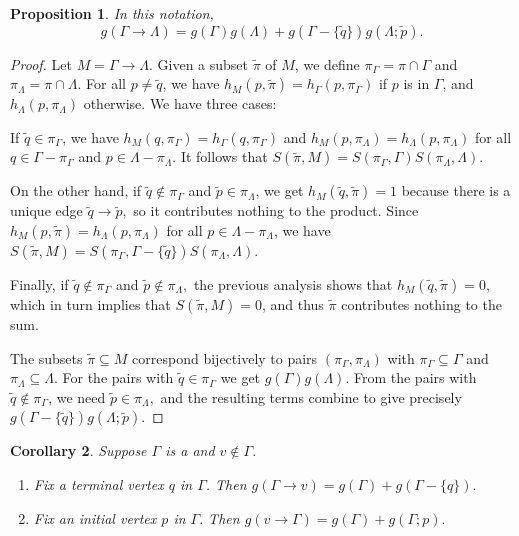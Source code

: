 \documentclass[a4paper, 12pt]{article}
\newenvironment{enumrealm}{\setlength{\abovedisplayskip}{5pt}
\setlength{\belowdisplayskip}{5pt}}{\setlength{\abovedisplayskip}{10.0pt plus 2.0pt minus 5.0pt}
\setlength{\belowdisplayskip}{10.0pt plus 2.0pt minus 5.0pt}}
\newcommand{\qo}{\tilde{q}}
\newcommand{\pin}{\tilde{p}}
\newcommand{\tilpi}{\tilde{\pi}}
\newcommand{\piga}{\pi_\Gamma}
\newcommand{\pila}{\pi_\Lambda}
\theoremstyle{plain}
\newtheorem{prop}{Proposition}[section]
\newtheorem{cor}[prop]{Corollary}
\theoremstyle{definition}
\begin{document}
\begin{prop}
	In this notation, \begin{enumrealm}\begin{equation*} g(\Gamma \rightarrow \Lambda) = g(\Gamma)g(\Lambda) + g(\Gamma - \{\qo\})g(\Lambda; \pin). \end{equation*}\end{enumrealm}
\end{prop}
\begin{proof}
	Let $M = \Gamma \rightarrow \Lambda.$ Given a subset $\tilpi$ of $M$, we define $\piga = \pi \cap \Gamma$ and $\pila = \pi \cap \Lambda$. For all $p \neq \qo$, we have $h_M(p, \tilpi) = h_\Gamma(p, \piga)$ if $p$ is in $\Gamma$, and $h_\Lambda(p, \pila)$ otherwise. We have three cases:
	
	
	If $\qo \in \piga$, we have $h_M(q, \piga) = h_\Gamma(q, \piga)$ and $h_M(p, \pila) = h_\Lambda(p, \pila)$ for all $q \in \Gamma - \piga$ and $p \in \Lambda - \pila$. It follows that $S(\tilpi, M) = S(\piga, \Gamma)S(\pila, \Lambda).$
	
	On the other hand, if $\qo\notin\piga$ and $\pin \in \pila$, we get $h_M(\qo, \tilpi) = 1$ because there is a unique edge $\qo \rightarrow \pin,$ so it contributes nothing to the product. Since $h_M(p, \tilpi) = h_\Lambda(p, \pila)$ for all $p \in \Lambda - \pila$, we have $S(\tilpi, M) = S(\piga, \Gamma - \{\qo\})S(\pila, \Lambda)$.
	
	Finally, if $\qo \notin \piga$ and $\pin\notin\pila,$ the previous analysis shows that $h_M(\qo, \tilpi) = 0$, which in turn implies that $S(\tilpi, M) = 0$, and thus $\tilpi$ contributes nothing to the sum.
	
	The subsets $\tilpi \subseteq M$ correspond bijectively to pairs $(\piga, \pila)$ with $\piga \subseteq \Gamma$ and $\pila \subseteq \Lambda.$ For the pairs with $\qo \in \piga$ we get $g(\Gamma)g(\Lambda)$. From the pairs with $\qo \notin \piga$, we need $\pin \in \pila,$ and the resulting terms combine to give precisely $g(\Gamma - \{\qo\})g(\Lambda; \pin).$
\end{proof}

\begin{cor} Suppose $\Gamma$ is a  and $v \notin \Gamma$.\listspace
	\begin{enumerate} \listspace
		\item Fix a terminal vertex $q$ in $\Gamma$. Then $g(\Gamma \rightarrow v) = g(\Gamma) + g(\Gamma - \{q\}).$
		\item Fix an initial vertex $p$ in $\Gamma.$ Then $g(v \rightarrow \Gamma) = g(\Gamma) + g(\Gamma; p).$
	\end{enumerate}\textspace
\end{cor}
\end{document}
